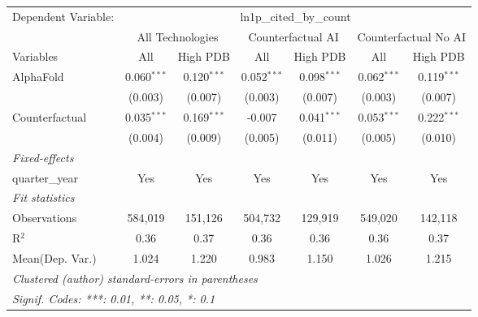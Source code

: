 \begingroup
\centering
\begin{tabular}{lcccccc}
   \tabularnewline \midrule \midrule
   Dependent Variable: & \multicolumn{6}{c}{ln1p\_cited\_by\_count}\\
 & \multicolumn{2}{c}{All Technologies} & \multicolumn{2}{c}{Counterfactual AI} & \multicolumn{2}{c}{Counterfactual No AI} \\
\cmidrule(lr){1-1}\cmidrule(lr){2-3} \cmidrule(lr){4-5} \cmidrule(lr){6-7}
Variables & \multicolumn{1}{c}{All} & \multicolumn{1}{c}{High PDB} & \multicolumn{1}{c}{All} & \multicolumn{1}{c}{High PDB} & \multicolumn{1}{c}{All} & \multicolumn{1}{c}{High PDB} \\
\cmidrule(lr){1-1}\cmidrule(lr){2-2} \cmidrule(lr){3-3} \cmidrule(lr){4-4} \cmidrule(lr){5-5} \cmidrule(lr){6-6} \cmidrule(lr){7-7}
   AlphaFold      & 0.060$^{***}$ & 0.120$^{***}$ & 0.052$^{***}$ & 0.098$^{***}$ & 0.062$^{***}$ & 0.119$^{***}$\\   
                  & (0.003)       & (0.007)       & (0.003)       & (0.007)       & (0.003)       & (0.007)\\   
   Counterfactual & 0.035$^{***}$ & 0.169$^{***}$ & -0.007        & 0.041$^{***}$ & 0.053$^{***}$ & 0.222$^{***}$\\   
                  & (0.004)       & (0.009)       & (0.005)       & (0.011)       & (0.005)       & (0.010)\\   
   \midrule
   \emph{Fixed-effects}\\
   quarter\_year  & Yes           & Yes           & Yes           & Yes           & Yes           & Yes\\  
   \midrule
   \emph{Fit statistics}\\
   Observations   & 584,019       & 151,126       & 504,732       & 129,919       & 549,020       & 142,118\\  
   R$^2$          & 0.36          & 0.37          & 0.36          & 0.36          & 0.36          & 0.37\\  
Mean(Dep. Var.) & 1.024 & 1.220 & 0.983 & 1.150 & 1.026 & 1.215 \\
   \midrule \midrule
   \multicolumn{7}{l}{\emph{Clustered (author) standard-errors in parentheses}}\\
   \multicolumn{7}{l}{\emph{Signif. Codes: ***: 0.01, **: 0.05, *: 0.1}}\\
\end{tabular}
\par\endgroup
